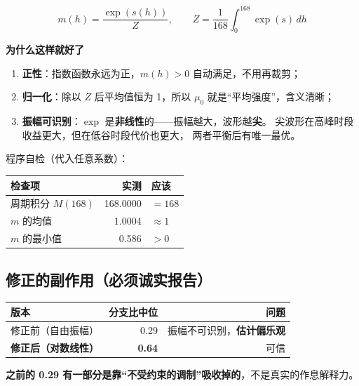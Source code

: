 \documentclass[UTF8,a4paper,11pt]{ctexart}
\newenvironment{explainbox}[1]
{\begin{center}\begin{minipage}{0.94\textwidth}\colorbox{boxbg}{\parbox{0.92\textwidth}{\textbf{#1}\par\vspace{2pt}}}}
{\end{minipage}\end{center}}
\newcommand{\warn}[1]{\textcolor{red!70!black}{\textbf{#1}}}
\begin{document}
\begin{equation}
m(h) = \frac{\exp(s(h))}{Z},
\qquad
Z = \frac{1}{168}\int_0^{168}\exp(s)\,dh
\end{equation}

\begin{explainbox}{为什么这样就好了}
\begin{enumerate}[leftmargin=1.4em,itemsep=2pt]
\item \textbf{正性}：指数函数永远为正，$m(h)>0$ 自动满足，不用再裁剪；
\item \textbf{归一化}：除以 $Z$ 后平均值恒为 1，所以 $\mu_0$ 就是“平均强度”，含义清晰；
\item \textbf{振幅可识别}：$\exp$ 是\textbf{非线性}的——振幅越大，波形越\textbf{尖}。
      尖波形在高峰时段收益更大，但在低谷时段代价也更大，
      两者平衡后有唯一最优。
\end{enumerate}
\end{explainbox}

程序自检（代入任意系数）：

\begin{center}
\begin{tabular}{lrl}
\toprule
\textbf{检查项} & \textbf{实测} & \textbf{应该} \\
\midrule
周期积分 $M(168)$ & 168.0000 & $=168$ \\
$m$ 的均值 & 1.0004 & $\approx 1$ \\
$m$ 的最小值 & 0.586 & $>0$ \\
\bottomrule
\end{tabular}
\end{center}

\subsection{修正的副作用（必须诚实报告）}

\begin{center}
\begin{tabular}{p{5.4cm}rr}
\toprule
\textbf{版本} & \textbf{分支比中位} & \textbf{问题} \\
\midrule
修正前（自由振幅） & 0.29 & 振幅不可识别，\warn{估计偏乐观} \\
\textbf{修正后（对数线性）} & \textbf{0.64} & 可信 \\
\bottomrule
\end{tabular}
\end{center}

\textbf{之前的 0.29 有一部分是靠“不受约束的调制”吸收掉的}，不是真实的作息解释力。
\end{document}
